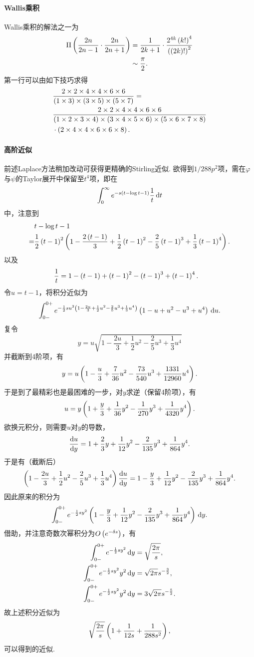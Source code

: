 \documentclass[UTF-8]{ctexart}
\begin{document}
  \paragraph{Wallis乘积}Wallis乘积的解法之一为
  \begin{align*}
    \Pi\left(\frac{2n}{2n-1}\cdot\frac{2n}{2n+1}\right) &= \frac{1}{2k+1}\cdot\frac{2^{4k}\left(k!\right)^4}{\left(\left(2k\right)!\right)^2} \\
    &\sim \frac{\pi}{2}.
  \end{align*}
  第一行可以由如下技巧求得
  \newcommand{\x}{\times}
  \begin{align*}
  &\frac{2\x2\x4\x4\x6\x6}{\pare{1\x3}\x\pare{3\x5}\x\pare{5\x7}} =\\ &\frac{2\x2\x4\x4\x6\x6}{\pare{1\x2\x3\x4}\x\pare{3\x4\x5\x6}\x\pare{5\x6\x7\x8}}\\ &\cdot\pare{2\x4\x4\x6\x6\x8}.
  \end{align*}
  \paragraph{高阶近似}前述Laplace方法稍加改动可获得更精确的Stirling近似. 欲得到$1/288p^2$项，需在$\varphi$与$\psi$的Taylor展开中保留至$t^4$项，即在
  \[ \int_0^\infty e^{-s\left(t-\log t -1\right)}\frac{1}{t} \, \mathrm{d} t \]
  中，注意到
  \begin{align*}
  & t-\log t-1\\
  =& \frac{1}{2} \left(t-1\right)^2\left(1-\frac{2 \left(t-1\right)}{3}+\frac{1}{2} \left(t-1\right)^2-\frac{2}{5} \left(t-1\right)^3+\frac{1}{3} \left(t-1\right)^4\right). 
  \end{align*}
  以及
  \begin{align*}
    &\frac{1}{t} = 1-\left(t-1\right)+\left(t-1\right)^2-\left(t-1\right)^3+\left(t-1\right)^4.
  \end{align*}
  令$u=t-1$，将积分近似为
  \[ \int_{0-}^{0+} e^{-\frac{1}{2} su^2\left(1-\frac{2 u}{3}+\frac{1}{2} u^2-\frac{2}{5} u^3+\frac{1}{3} u^4\right)}\left(1-u+u^2-u^3+u^4\right) \, \mathrm{d} u. \]
  复令
  \[ y=u\sqrt{1-\frac{2 u}{3}+\frac{1}{2} u^2-\frac{2}{5} u^3+\frac{1}{3} u^4} \]
  并截断到4阶项，有
  \[ y= u\left(1-\frac{u}{3}+\frac{7}{36}u^2-\frac{73}{540}u^3+\frac{1331}{12960}u^4\right). \]
  于是到了最精彩也是最困难的一步，对$y$求逆（保留4阶项），有
  \[ u=y\left(1+\frac{y}{3}+\frac{1}{36}y^2-\frac{1}{270}y^3+\frac{1}{4320}y^4\right). \]
  欲换元积分，则需要$u$对$y$的导数，
  \[ \frac{\mathrm{d} u}{\mathrm{d} y} = 1+\frac{2}{3}y+\frac{1}{12}y^2-\frac{2}{135}y^3+\frac{1}{864}y^4. \]
  于是有（截断后）
  \[ \left(1-\frac{2 u}{3}+\frac{1}{2} u^2-\frac{2}{5} u^3+\frac{1}{3} u^4\right) \frac{\mathrm{d} u}{\mathrm{d} y} = 1-\frac{y}{3}+\frac{1}{12}y^2-\frac{2}{135}y^3+\frac{1}{864}y^4. \]
  因此原来的积分为
  \[ \int_{0-}^{0+} e^{-\frac{1}{2} s y^2}\left(1-\frac{y}{3}+\frac{1}{12}y^2-\frac{2}{135}y^3+\frac{1}{864}y^4\right) \, \mathrm{d} y. \]
  借助，并注意奇数次幂积分为$O\left(e^{-\delta s}\right)$，有
  \begin{align*}
  \int_{0-}^{0+} e^{-\frac{1}{2} s y^2} \, \mathrm{d} y &= \sqrt{\frac{2\pi}{s}}, \\
  \int_{0-}^{0+} e^{-\frac{1}{2} s y^2}y^2 \, \mathrm{d} y &= \sqrt{2\pi}s^{-\frac{3}{2}}, \\
  \int_{0-}^{0+} e^{-\frac{1}{2} s y^2}y^2 \, \mathrm{d} y &= 3\sqrt{2\pi}s^{-\frac{5}{2}}.
  \end{align*}
  故上述积分近似为
  \[ \sqrt{\frac{2\pi}{s}}\left(1+\frac{1}{12s}+\frac{1}{288s^2}\right), \]
  可以得到的近似.
\end{document}
